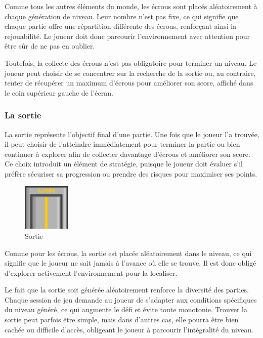 \documentclass[10pt]{report}
\begin{document}
Comme tous les autres éléments du monde, les écrous sont placés aléatoirement à chaque génération de niveau.
Leur nombre n’est pas fixe, ce qui signifie que chaque partie offre une répartition différente des écrous,
renforçant ainsi la rejouabilité.
Le joueur doit donc parcourir l’environnement avec attention pour être sûr de ne pas en oublier.

Toutefois, la collecte des écrous n’est pas obligatoire pour terminer un niveau.
Le joueur peut choisir de se concentrer sur la recherche de la sortie ou, au contraire, tenter de récupérer
un maximum d’écrous pour améliorer son score, affiché dans le coin supérieur gauche de l’écran.


\subsubsection{La sortie}

La sortie représente l'objectif final d'une partie.
Une fois que le joueur l'a trouvée, il peut choisir de l’atteindre immédiatement pour terminer la partie ou bien
continuer à explorer afin de collecter davantage d’écrous et améliorer son score.
Ce choix introduit un élément de stratégie, puisque le joueur doit évaluer s’il préfère sécuriser sa progression
ou prendre des risques pour maximiser ses points.

\begin{figure}[H]
  \centering
  \includegraphics[width=0.2\textwidth]{images/exit}
  \caption{Sortie}
\end{figure}


Comme pour les écrous, la sortie est placée aléatoirement dans le niveau, ce qui signifie que le joueur ne sait
jamais à l’avance où elle se trouve.
Il est donc obligé d’explorer activement l’environnement pour la localiser.

Le fait que la sortie soit générée aléatoirement renforce la diversité des parties.
Chaque session de jeu demande au joueur de s’adapter aux conditions spécifiques du niveau généré, ce qui augmente
le défi et évite toute monotonie.
Trouver la sortie peut parfois être simple, mais dans d’autres cas, elle pourra être bien cachée ou difficile d’accès,
obligeant le joueur à parcourir l’intégralité du niveau.
\end{document}
